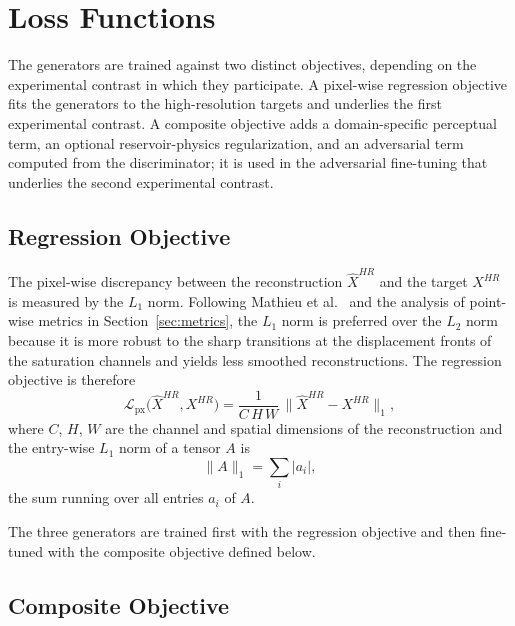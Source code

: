 \section{Loss Functions}
\label{sec:method_losses}

The generators are trained against two distinct objectives, depending on the experimental contrast in which they participate. A pixel-wise regression objective fits the generators to the high-resolution targets and underlies the first experimental contrast. A composite objective adds a domain-specific perceptual term, an optional reservoir-physics regularization, and an adversarial term computed from the discriminator; it is used in the adversarial fine-tuning that underlies the second experimental contrast.


\subsection{Regression Objective}
\label{subsec:method_loss_regression}

The pixel-wise discrepancy between the reconstruction $\widehat{X}^{HR}$ and the target $X^{HR}$ is measured by the $L_1$ norm. Following Mathieu et al.~\cite{mathieu2016deep} and the analysis of point-wise metrics in Section~\ref{sec:metrics}, the $L_1$ norm is preferred over the $L_2$ norm because it is more robust to the sharp transitions at the displacement fronts of the saturation channels and yields less smoothed reconstructions. The regression objective is therefore
\begin{equation}
    \mathcal{L}_{\mathrm{px}}\!\bigl(\widehat{X}^{HR}, X^{HR}\bigr) = \frac{1}{C \, H \, W} \, \bigl\| \widehat{X}^{HR} - X^{HR} \bigr\|_{1},
    \label{eq:loss_pixel}
\end{equation}
where $C$, $H$, $W$ are the channel and spatial dimensions of the reconstruction and the entry-wise $L_1$ norm of a tensor $A$ is
\begin{equation}
    \| A \|_{1} = \sum_{i} |a_i|,
    \label{eq:l1_norm}
\end{equation}
the sum running over all entries $a_i$ of $A$.

The three generators are trained first with the regression objective and then fine-tuned with the composite objective defined below.


\subsection{Composite Objective}
\label{subsec:method_loss_adversarial}


